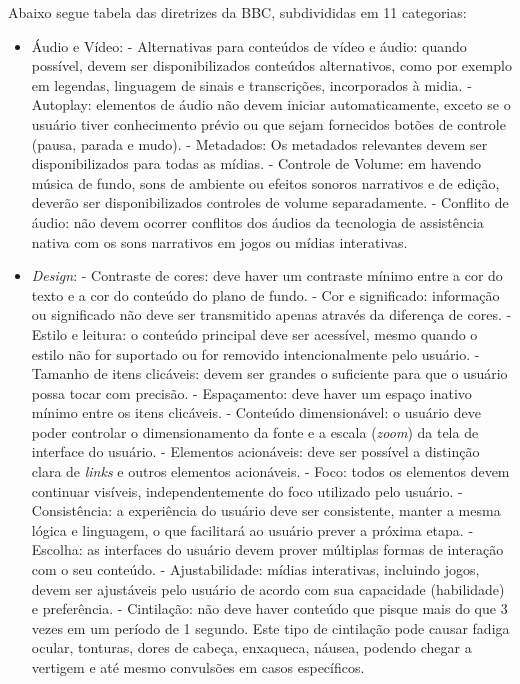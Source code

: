 Abaixo segue tabela das diretrizes da BBC, subdivididas em 11 categorias:

\begin{itemize}
	\item Áudio e Vídeo:
		\subitem - Alternativas para conteúdos de vídeo e áudio: quando possível, devem ser disponibilizados conteúdos alternativos, como por exemplo em legendas, linguagem de sinais e transcrições, incorporados à midia.
		\subitem - Autoplay: elementos de áudio não devem iniciar automaticamente, exceto se o usuário tiver conhecimento prévio ou que sejam fornecidos botões de controle (pausa, parada e mudo).
		\subitem - Metadados: Os metadados relevantes devem ser disponibilizados para todas as mídias.
		\subitem - Controle de Volume: em havendo música de fundo, sons de ambiente ou efeitos sonoros narrativos e de edição, deverão ser disponibilizados controles de volume separadamente.
		\subitem - Conflito de áudio: não devem ocorrer conflitos dos áudios da tecnologia de assistência nativa com os sons narrativos em jogos ou mídias interativas.
	\item \textit{Design}:
		\subitem - Contraste de cores: deve haver um contraste mínimo entre a cor do texto e a cor do conteúdo do plano de fundo.
		\subitem - Cor e significado: informação ou significado não deve ser transmitido apenas através da diferença de cores.
		\subitem - Estilo e leitura: o conteúdo principal deve ser acessível, mesmo quando o estilo não for suportado ou for removido intencionalmente pelo usuário.
		\subitem - Tamanho de itens clicáveis: devem ser grandes o suficiente para que o usuário possa tocar com precisão.
		\subitem - Espaçamento: deve haver um espaço inativo mínimo entre os itens clicáveis.
		\subitem - Conteúdo dimensionável: o usuário deve poder controlar o dimensionamento da fonte e a escala (\textit{zoom}) da tela de interface do usuário.
		\subitem - Elementos acionáveis: deve ser possível a distinção clara de \textit{links} e outros elementos acionáveis.
		\subitem - Foco: todos os elementos devem continuar visíveis, independentemente do foco utilizado pelo usuário.
		\subitem - Consistência: a experiência do usuário deve ser consistente, manter a mesma lógica e linguagem, o que facilitará ao usuário prever a próxima etapa.
		\subitem - Escolha: as interfaces do usuário devem prover múltiplas formas de interação com o seu conteúdo.
		\subitem - Ajustabilidade: mídias interativas, incluindo jogos, devem ser ajustáveis pelo usuário de acordo com sua capacidade (habilidade) e preferência.
		\subitem - Cintilação: não deve haver conteúdo que pisque mais do que 3 vezes em um período de 1 segundo. Este tipo de cintilação pode causar fadiga ocular, tonturas, dores de cabeça, enxaqueca, náusea, podendo chegar a vertigem e até mesmo convulsões em casos específicos.

\end{itemize}
